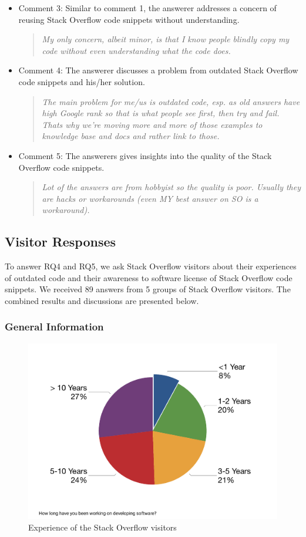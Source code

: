 \documentclass{svjour3}                     %
\begin{document}
\begin{itemize}[label={}]
	\item Comment 3: Similar to comment 1, the answerer addresses a concern of
reusing Stack Overflow code snippets without understanding.
	
	\begin{quote}\textit{My only concern, albeit minor, is that I know people
			blindly copy my code without even understanding what the code does.}\end{quote}
	
	\item Comment 4: The answerer discusses a problem from outdated Stack Overflow code snippets and
	his/her solution.
	
	\begin{quote}\textit{The main problem for me/us is outdated code, esp. as old
			answers have high Google rank so that is what people see first, then try and
			fail. Thats why we're moving more and more of those examples to knowledge base
			and docs and rather link to those.}\end{quote}
	
	\item Comment 5: The answerers gives insights into the quality of the Stack
	Overflow code snippets.
	
	\begin{quote}\textit{Lot of the answers are from hobbyist so the quality is
			poor. Usually they are hacks or workarounds (even MY best answer on SO is a
			workaround).}\end{quote} \end{itemize}

\subsection{Visitor Responses}

To answer RQ4 and RQ5, we ask Stack Overflow visitors about their experiences of
outdated code and their awareness to software license of Stack Overflow code
snippets. We received 89 answers from 5 groups of Stack Overflow visitors. The
combined results and discussions are presented below.

\subsubsection*{General Information}

\begin{figure}
		\centering
		\includegraphics[width=0.5\linewidth]{survey_visitor_exp}
		\caption{Experience of the Stack Overflow visitors}
		\label{fig:survey_visitor_exp}
\end{figure}
\end{document}
